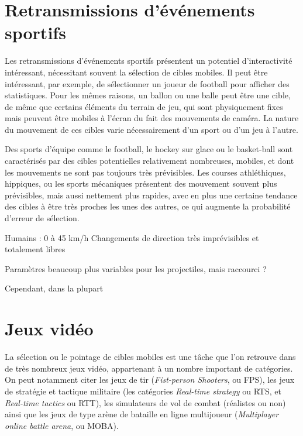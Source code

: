 	\section{Retransmissions d'événements sportifs}
	Les retransmissions d'événements sportifs présentent un potentiel d'interactivité intéressant, nécessitant souvent la sélection de cibles mobiles. Il peut être intéressant, par exemple, de sélectionner un joueur de football pour afficher des statistiques. Pour les mêmes raisons, un ballon ou une balle peut être une cible, de même que certains éléments du terrain de jeu, qui sont physiquement fixes mais peuvent être mobiles à l'écran du fait des mouvements de caméra. La nature du mouvement de ces cibles varie nécessairement d'un sport ou d'un jeu à l'autre.
	
	Des sports d'équipe comme le football, le hockey sur glace ou le basket-ball sont caractérisés par des cibles potentielles relativement nombreuses, mobiles, et dont les mouvements ne sont pas toujours très prévisibles. Les courses athléthiques, hippiques, ou les sports mécaniques présentent des mouvement souvent plus prévisibles, mais aussi nettement plus rapides, avec en plus une certaine tendance des cibles à être très proches les unes des autres, ce qui augmente la probabilité d'erreur de sélection.
	
	Humains : 0 à 45 km/h
	Changements de direction très imprévisibles et totalement libres
	
	Paramètres beaucoup plus variables pour les projectiles, mais raccourci ?
	
	Cependant, dans la plupart 
	
	\section{Jeux vidéo}
	La sélection ou le pointage de cibles mobiles est une tâche que l'on retrouve dans de très nombreux jeux vidéo, appartenant à un nombre important de catégories. On peut notamment citer les jeux de tir (\emph{Fist-person Shooters}, ou FPS), les jeux de stratégie et tactique militaire (les catégories \emph{Real-time strategy} ou RTS, et \emph{Real-time tactics} ou RTT), les simulateurs de vol de combat (réalistes ou non) ainsi que les jeux de type arène de bataille en ligne multijoueur (\emph{Multiplayer online battle arena}, ou MOBA).
	
	
	
	\section{}
    
